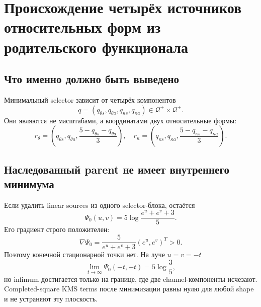 \chapter{Происхождение четырёх источников относительных форм из родительского функционала}
\label{ch:v9-endpoint-kms-shape-source-origin}

\section{Что именно должно быть выведено}

Минимальный selector зависит от четырёх компонентов
\begin{equation}
 q=(q_{\theta s},q_{\theta a},q_{\kappa s},q_{\kappa a})
 \in\mathcal Q^+\times\mathcal Q^+.
 \label{eq:v9-kms-shape-source-origin-package}
\end{equation}
Они являются не масштабами, а координатами двух относительные формы:
\begin{equation}
 r_\theta=\left(q_{\theta s},q_{\theta a},
 \frac{5-q_{\theta s}-q_{\theta a}}3\right),
 \quad
 r_\kappa=\left(q_{\kappa s},q_{\kappa a},
 \frac{5-q_{\kappa s}-q_{\kappa a}}3\right).
 \label{eq:v9-kms-shape-source-origin-shapes}
\end{equation}

\section{Наследованный parent не имеет внутреннего минимума}

Если удалить linear sources из одного selector-блока, остаётся
\begin{equation}
 \Psi_0(u,v)=5\log\frac{e^u+e^v+3}{5}.
 \label{eq:v9-kms-shape-source-origin-source-free-block}
\end{equation}
Его градиент строго положителен:
\begin{equation}
 \nabla\Psi_0=\frac{5}{e^u+e^v+3}(e^u,e^v)^T>0.
 \label{eq:v9-kms-shape-source-origin-positive-gradient}
\end{equation}
Поэтому конечной стационарной точки нет. На луче $u=v=-t$
\begin{equation}
 \lim_{t\to\infty}\Psi_0(-t,-t)=5\log\frac35,
 \label{eq:v9-kms-shape-source-origin-boundary-infimum}
\end{equation}
но infimum достигается только на границе, где две channel-компоненты
исчезают. Completed-square KMS terms после минимизации равны нулю для любой
shape и не устраняют эту плоскость.

